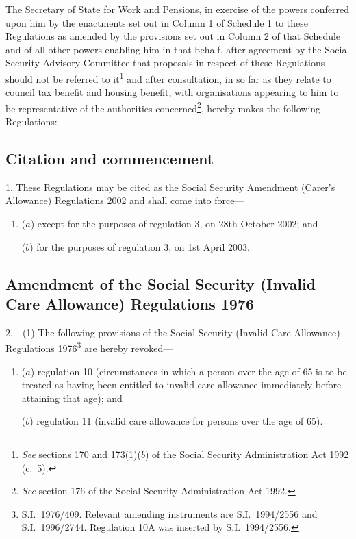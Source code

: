 \documentclass[12pt,a4paper]{article}
\title{\regstitle}
\author{S.I.\ 2002 No.\ 2497}
\date{Made
27th September 2002\\
Laid before Parliament
4th October 2002\\
Coming into force---\\
except for the purposes of regulation 3 28th October 2002\\
for the purposes of regulation 3 1st April 2003\\
}
\begin{document}
\maketitle

\noindent
The Secretary of State for Work and Pensions, in exercise of the powers conferred upon him by the enactments set out in Column 1 of Schedule 1 to these Regulations as amended by the provisions set out in Column 2 of that Schedule and of all other powers enabling him in that behalf, after agreement by the Social Security Advisory Committee that proposals in respect of these Regulations should not be referred to it\footnote{\emph{See} sections 170 and 173(1)($b$)  of the Social Security Administration Act 1992 (c.\ 5).} and after consultation, in so far as they relate to council tax benefit and housing benefit, with organisations appearing to him to be representative of the authorities concerned\footnote{\emph{See} section 176 of the Social Security Administration Act 1992.}, hereby makes the following Regulations: 

{\sloppy

\tableofcontents

}

\bigskip

\setcounter{secnumdepth}{-2}

\subsection[1. Citation and commencement]{Citation and commencement}

1.  These Regulations may be cited as the Social Security Amendment (Carer’s Allowance) Regulations 2002 and shall come into force—
\begin{enumerate}\item[]
($a$) except for the purposes of regulation 3, on 28th October 2002; and

($b$) for the purposes of regulation 3, on 1st April 2003.
\end{enumerate}

\subsection[2. Amendment of the Social Security (Invalid Care Allowance) Regulations 1976]{Amendment of the Social Security (Invalid Care Allowance) Regulations 1976}

2.---(1)  The following provisions of the Social Security (Invalid Care Allowance) Regulations 1976\footnote{S.I.\ 1976/409. Relevant amending instruments are S.I.\ 1994/2556 and S.I.\ 1996/2744. Regulation 10A was inserted by S.I.\ 1994/2556.} are hereby revoked—
\begin{enumerate}\item[]
($a$) regulation 10 (circumstances in which a person over the age of 65 is to be treated as having been entitled to invalid care allowance immediately before attaining that age); and

($b$) regulation 11 (invalid care allowance for persons over the age of 65).
\end{enumerate}
\end{document}

